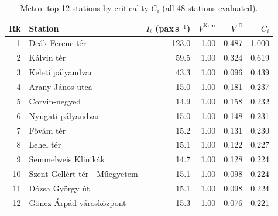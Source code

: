 \begin{table}[htbp]
\centering
\small
\begin{tabular}{rlrrrr}
\toprule
Rk & Station & $I_i$ (pax\,s$^{-1}$) & $V^{\mathrm{Kem}}$ & $V^{\mathrm{eff}}$ & $C_i$ \\
\midrule
1 & De\'ak Ferenc t\'er & 123.0 & 1.00 & 0.487 & 1.000 \\
2 & K\'alvin t\'er & 59.5 & 1.00 & 0.324 & 0.619 \\
3 & Keleti p\'alyaudvar & 43.3 & 1.00 & 0.096 & 0.439 \\
4 & Arany J\'anos utca & 15.0 & 1.00 & 0.181 & 0.237 \\
5 & Corvin-negyed & 14.9 & 1.00 & 0.158 & 0.232 \\
6 & Nyugati p\'alyaudvar & 15.0 & 1.00 & 0.148 & 0.231 \\
7 & F\H{o}v\'am t\'er & 15.2 & 1.00 & 0.131 & 0.230 \\
8 & Lehel t\'er & 15.1 & 1.00 & 0.122 & 0.227 \\
9 & Semmelweis Klinik\'ak & 14.7 & 1.00 & 0.128 & 0.224 \\
10 & Szent Gell\'ert t\'er - M\H{u}egyetem & 15.1 & 1.00 & 0.098 & 0.224 \\
11 & D\'ozsa Gy\"orgy \'ut & 15.1 & 1.00 & 0.098 & 0.224 \\
12 & G\"oncz \'Arp\'ad v\'arosk\"ozpont & 15.3 & 1.00 & 0.076 & 0.221 \\
\bottomrule
\end{tabular}
\caption{Metro: top-12 stations by criticality $C_i$ (all 48 stations evaluated).}
\label{tab:resilience}
\par{}
\end{table}
